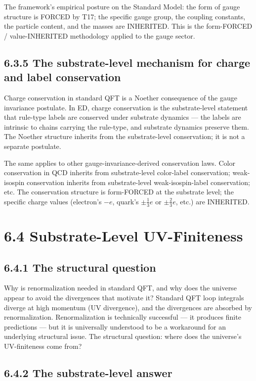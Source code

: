 \documentclass[11pt]{book}
\begin{document}
The framework's empirical posture on the Standard Model: the form of gauge structure is FORCED by T17; the specific gauge group, the coupling constants, the particle content, and the masses are INHERITED. This is the form-FORCED / value-INHERITED methodology applied to the gauge sector.

\subsection{6.3.5 The substrate-level mechanism for charge and label conservation}

Charge conservation in standard QFT is a Noether consequence of the gauge invariance postulate. In ED, charge conservation is the substrate-level statement that rule-type labels are conserved under substrate dynamics — the labels are intrinsic to chains carrying the rule-type, and substrate dynamics preserve them. The Noether structure inherits from the substrate-level conservation; it is not a separate postulate.

The same applies to other gauge-invariance-derived conservation laws. Color conservation in QCD inherits from substrate-level color-label conservation; weak-isospin conservation inherits from substrate-level weak-isospin-label conservation; etc. The conservation structure is form-FORCED at the substrate level; the specific charge values (electron's $-e$, quark's $\pm \frac{1}{3}e$ or $\pm \frac{2}{3}e$, etc.) are INHERITED.

\section{6.4 Substrate-Level UV-Finiteness}

\subsection{6.4.1 The structural question}

Why is renormalization needed in standard QFT, and why does the universe appear to avoid the divergences that motivate it? Standard QFT loop integrals diverge at high momentum (UV divergence), and the divergences are absorbed by renormalization. Renormalization is technically successful — it produces finite predictions — but it is universally understood to be a workaround for an underlying structural issue. The structural question: where does the universe's UV-finiteness come from?

\subsection{6.4.2 The substrate-level answer}
\end{document}
